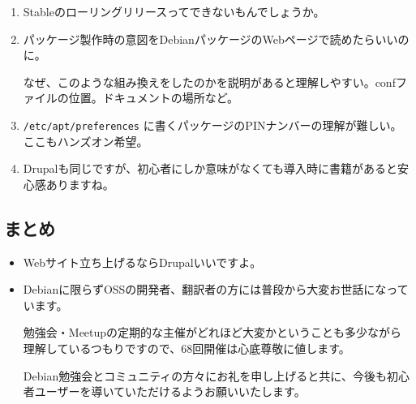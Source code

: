 \documentclass[mingoth,a4paper]{jsarticle}
\begin{document}
\begin{enumerate}
\item Stableのローリングリリースってできないもんでしょうか。

\item パッケージ製作時の意図をDebianパッケージのWebページで読めたらいいのに。

なぜ、このような組み換えをしたのかを説明があると理解しやすい。confファイルの位置。ドキュメントの場所など。

\item {\tt /etc/apt/preferences} に書くパッケージのPINナンバーの理解が難しい。ここもハンズオン希望。

\item Drupalも同じですが、初心者にしか意味がなくても導入時に書籍があると安心感ありますね。
\end{enumerate}

\subsection{まとめ}
\begin{itemize}
\item Webサイト立ち上げるならDrupalいいですよ。
\item Debianに限らずOSSの開発者、翻訳者の方には普段から大変お世話になっています。

勉強会・Meetupの定期的な主催がどれほど大変かということも多少ながら理解しているつもりですので、68回開催は心底尊敬に値します。

Debian勉強会とコミュニティの方々にお礼を申し上げると共に、今後も初心者ユーザーを導いていただけるようお願いいたします。
\end{itemize}
\end{document}
